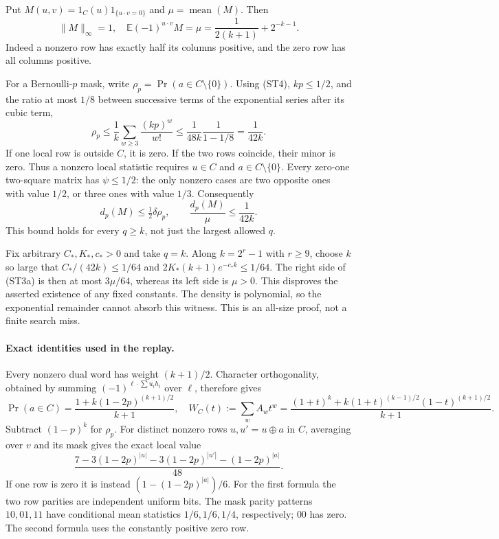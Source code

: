 \documentclass[11pt]{article}
\newcommand{\E}{\mathbb E}
\begin{document}
Put $M(u,v)=1_C(u)1_{\{u\cdot v=0\}}$ and $\mu=\operatorname{mean}(M)$.
Then
\[
 \|M\|_\infty=1,\quad
 \E(-1)^{u\cdot v}M=\mu
       =\frac1{2(k+1)}+2^{-k-1}.                         \tag{ST5}
\]
Indeed a nonzero row has exactly half its columns positive, and
the zero row has all columns positive.

For a Bernoulli-$p$ mask, write
$\rho_p=\Pr(a\in C\setminus\{0\})$.
Using (ST4), $kp\le1/2$, and the ratio at most $1/8$ between
successive terms of the exponential series after its cubic term,
\[
 \rho_p\le\frac1k\sum_{w\ge3}\frac{(kp)^w}{w!}
             \le\frac1{48k}\frac1{1-1/8}
             =\frac1{42k}.                              \tag{ST6}
\]
If one local row is outside $C$, it is zero.
If the two rows coincide, their minor is zero.
Thus a nonzero local statistic requires $u\in C$ and
$a\in C\setminus\{0\}$. Every zero-one two-square matrix has
$\psi\le1/2$: the only nonzero cases are two opposite ones
with value $1/2$, or three ones with value $1/3$.
Consequently
\[
 d_p(M)\le\tfrac12\delta\rho_p,\qquad
                    \frac{d_p(M)}{\mu}\le\frac1{42k}.    \tag{ST7}
\]
This bound holds for every $q\ge k$, not just the largest allowed $q$.

Fix arbitrary $C_*,K_*,c_*>0$ and take $q=k$.
Along $k=2^r-1$ with $r\ge9$, choose $k$ so large that
$C_* /(42k)\le1/64$ and
$2K_*(k+1)e^{-c_*k}\le1/64$.
The right side of (ST3a) is then at most $3\mu/64$,
whereas its left side is $\mu>0$.
This disproves the asserted existence of any fixed constants.
The density is polynomial, so the exponential remainder cannot
absorb this witness. This is an all-size proof, not a finite search miss.

\paragraph{Exact identities used in the replay.}
Every nonzero dual word has weight $(k+1)/2$. Character orthogonality,
obtained by summing $(-1)^{\ell\cdot\sum u_i h_i}$ over $\ell$,
therefore gives
\[
 \Pr(a\in C)=
  \frac{1+k(1-2p)^{(k+1)/2}}{k+1},\quad
 W_C(t):=\sum_w A_wt^w
 =\frac{(1+t)^k+k(1+t)^{(k-1)/2}(1-t)^{(k+1)/2}}{k+1}.
\]
Subtract $(1-p)^k$ for $\rho_p$.
For distinct nonzero rows $u,u'=u\oplus a$ in $C$,
averaging over $v$ and its mask gives the exact local value
\[
 \frac{7-3(1-2p)^{|u|}-3(1-2p)^{|u'|}
                    -(1-2p)^{|a|}}{48}.
\]
If one row is zero it is instead
$(1-(1-2p)^{|a|})/6$.
For the first formula the two row parities are independent uniform
bits. The mask parity patterns $10,01,11$ have conditional
mean statistics $1/6,1/6,1/4$, respectively; $00$ has zero.
The second formula uses the constantly positive zero row.
\end{document}

